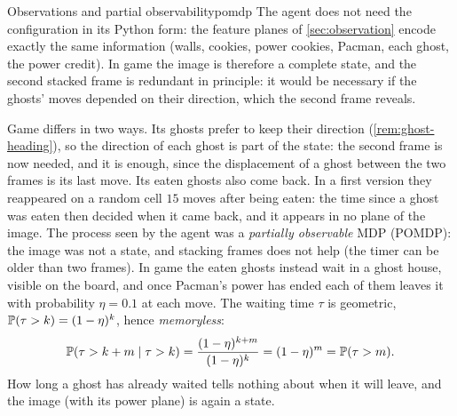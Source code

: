 \begin{remark}{Observations and partial observability}{pomdp}
  The agent does not need the configuration in its Python form: the
  feature planes of \cref{sec:observation} encode exactly the same
  information (walls, cookies, power cookies, Pacman, each ghost, the power
  credit). In game  the image is therefore a complete state, and the
  second stacked frame is redundant in principle: it would be necessary if
  the ghosts' moves depended on their direction, which the second frame
  reveals.

  Game  differs in two ways. Its ghosts prefer to keep their
  direction (\cref{rem:ghost-heading}), so the direction of each ghost is
  part of the state: the second frame is now needed, and it is enough,
  since the displacement of a ghost between the two frames is its last
  move. Its eaten ghosts also come back. In a first version they
  reappeared on a random cell $15$ moves after being eaten: the time since
  a ghost was eaten then decided when it came back, and it appears in no
  plane of the image. The process seen by the agent was a \emph{partially
  observable} MDP (POMDP): the image was not a state, and stacking frames
  does not help (the timer can be older than two frames). In game
   the eaten ghosts instead wait in a ghost house, visible on the
  board, and once Pacman's power has ended each of them leaves it with
  probability $\eta = 0.1$ at each move. The waiting time $\tau$ is
  geometric, $\mathbb{P}(\tau > k) = (1 - \eta)^k$, hence \emph{memoryless}:
  \begin{equation*}
    \mathbb{P}(\tau > k + m \mid \tau > k) = \frac{(1 - \eta)^{k + m}}{(1 -
    \eta)^k} = (1 - \eta)^m = \mathbb{P}(\tau > m).
  \end{equation*}
  How long a ghost has already waited tells nothing about when it will
  leave, and the image (with its power plane) is again a state.
\end{remark}


